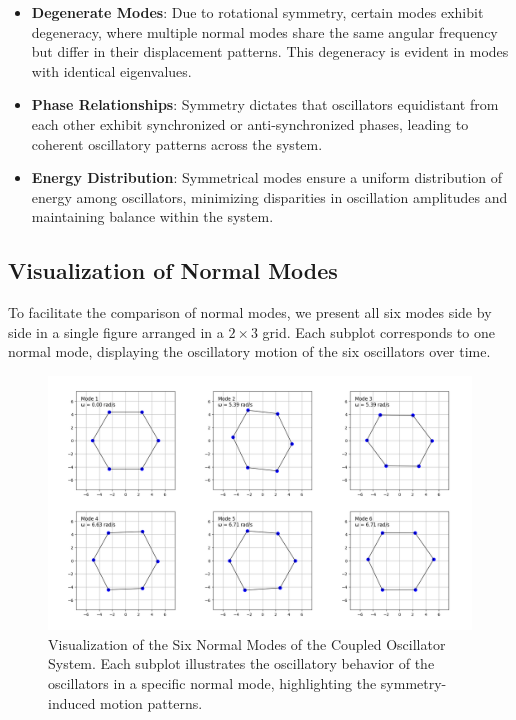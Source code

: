 \documentclass[12pt]{report} %
\begin{document}
\begin{itemize}
    \item \textbf{Degenerate Modes}: Due to rotational symmetry, certain modes exhibit degeneracy, where multiple normal modes share the same angular frequency but differ in their displacement patterns. This degeneracy is evident in modes with identical eigenvalues.
    
    \item \textbf{Phase Relationships}: Symmetry dictates that oscillators equidistant from each other exhibit synchronized or anti-synchronized phases, leading to coherent oscillatory patterns across the system.
    
    \item \textbf{Energy Distribution}: Symmetrical modes ensure a uniform distribution of energy among oscillators, minimizing disparities in oscillation amplitudes and maintaining balance within the system.
\end{itemize}

\subsection{Visualization of Normal Modes}
\label{subsec:part2_task3_visualization}

To facilitate the comparison of normal modes, we present all six modes side by side in a single figure arranged in a \( 2 \times 3 \) grid. Each subplot corresponds to one normal mode, displaying the oscillatory motion of the six oscillators over time.

\begin{figure}[h]
    \centering
    \includegraphics[width=\textwidth]{normal_modes_animation.png} %
    \caption{Visualization of the Six Normal Modes of the Coupled Oscillator System. Each subplot illustrates the oscillatory behavior of the oscillators in a specific normal mode, highlighting the symmetry-induced motion patterns.}
    \label{fig:normal_modes_combined}
\end{figure}
\end{document}
